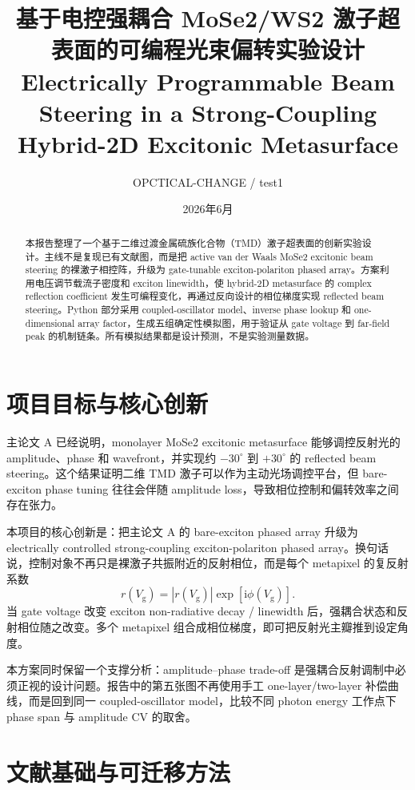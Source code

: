 \documentclass[UTF8,a4paper,12pt]{ctexart}
\title{\textbf{基于电控强耦合 MoSe2/WS2 激子超表面的可编程光束偏转实验设计}\\
\large Electrically Programmable Beam Steering in a Strong-Coupling Hybrid-2D Excitonic Metasurface}
\author{OPCTICAL-CHANGE / test1}
\date{2026年6月}
\newcommand{\vg}{V_{\mathrm{g}}}
\newcommand{\imagunit}{\mathrm{i}}
\begin{document}
\maketitle

\begin{abstract}
本报告整理了一个基于二维过渡金属硫族化合物（TMD）激子超表面的创新实验设计。主线不是复现已有文献图，而是把 active van der Waals MoSe2 excitonic beam steering 的裸激子相控阵，升级为 gate-tunable exciton-polariton phased array。方案利用电压调节载流子密度和 exciton linewidth，使 hybrid-2D metasurface 的 complex reflection coefficient 发生可编程变化，再通过反向设计的相位梯度实现 reflected beam steering。Python 部分采用 coupled-oscillator model、inverse phase lookup 和 one-dimensional array factor，生成五组确定性模拟图，用于验证从 gate voltage 到 far-field peak 的机制链条。所有模拟结果都是设计预测，不是实验测量数据。
\end{abstract}

\section{项目目标与核心创新}

主论文 A 已经说明，monolayer MoSe2 excitonic metasurface 能够调控反射光的 amplitude、phase 和 wavefront，并实现约 $-30^\circ$ 到 $+30^\circ$ 的 reflected beam steering。这个结果证明二维 TMD 激子可以作为主动光场调控平台，但 bare-exciton phase tuning 往往会伴随 amplitude loss，导致相位控制和偏转效率之间存在张力。

本项目的核心创新是：把主论文 A 的 bare-exciton phased array 升级为 electrically controlled strong-coupling exciton-polariton phased array。换句话说，控制对象不再只是裸激子共振附近的反射相位，而是每个 metapixel 的复反射系数
\begin{equation}
  r(\vg)=|r(\vg)|\exp[\imagunit \phi(\vg)].
\end{equation}
当 gate voltage 改变 exciton non-radiative decay / linewidth 后，强耦合状态和反射相位随之改变。多个 metapixel 组合成相位梯度，即可把反射光主瓣推到设定角度。

本方案同时保留一个支撑分析：amplitude--phase trade-off 是强耦合反射调制中必须正视的设计问题。报告中的第五张图不再使用手工 one-layer/two-layer 补偿曲线，而是回到同一 coupled-oscillator model，比较不同 photon energy 工作点下 phase span 与 amplitude CV 的取舍。

\section{文献基础与可迁移方法}
\end{document}
